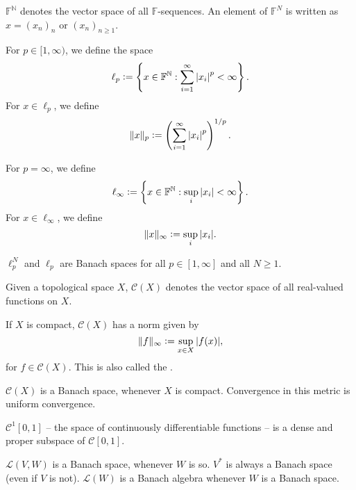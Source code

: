 \documentclass[12pt]{article}	%
\begin{document}
\begin{defn}
	$\mathbb{F}^{\mathbb{N}}$ denotes the vector space of all $\mathbb{F}$-sequences. An element of $\mathbb{F}^{N}$ is written as $x = (x_{n})_{n}$ or $(x_{n})_{n \ge 1}$.

	For $p \in [1, \infty)$, we define the space
	\begin{equation*} 
		\ell_{p} \vcentcolon= \left\{x \in \mathbb{F}^{\mathbb{N}} : \sum_{i = 1}^{\infty} {\left\lvert x_{i} \right\lvert}^{p} < \infty \right\}.
	\end{equation*}
	For $x \in \ell_{p}$, we define
	\begin{equation*} 
		\|x\|_{p} \vcentcolon= \left(\sum_{i = 1}^{\infty} {\left\lvert x_{i} \right\lvert}^{p}\right)^{1/p}.
	\end{equation*}

	For $p = \infty$, we define
	\begin{equation*} 
		\ell_{\infty} \vcentcolon= \left\{x \in \mathbb{F}^{\mathbb{N}} : \sup_{i} {\left\lvert x_{i} \right\lvert} < \infty \right\}.
	\end{equation*}
	For $x \in \ell_{\infty}$, we define
	\begin{equation*} 
		\|x\|_{\infty} \vcentcolon= \sup_{i} {\left\lvert x_{i} \right\lvert}.
	\end{equation*}
\end{defn}

$\ell_{p}^{N}$ and $\ell_{p}$ are Banach spaces for all $p \in [1, \infty]$ and all $N \ge 1$.

\begin{defn}
	Given a topological space $X$, $\mathcal{C}(X)$ denotes the vector space of all real-valued functions on $X$.

	If $X$ is compact, $\mathcal{C}(X)$ has a norm given by
	\begin{equation*} 
		\|f\|_{\infty} \vcentcolon= \sup_{x \in X} {\left\lvert f(x) \right\lvert},
	\end{equation*}
	for $f \in \mathcal{C}(X)$. This is also called the .
\end{defn}

\begin{ex}
	$\mathcal{C}(X)$ is a Banach space, whenever $X$ is compact. Convergence in this metric is uniform convergence.

	$\mathcal{C}^{1}[0, 1]$ -- the space of continuously differentiable functions -- is a dense and proper subspace of $\mathcal{C}[0, 1]$.
\end{ex}

\begin{ex}
	$\mathcal{L}(V, W)$ is a Banach space, whenever $W$ is so. $V^{\ast}$ is always a Banach space (even if $V$ is not). $\mathcal{L}(W)$ is a Banach algebra whenever $W$ is a Banach space.
\end{ex}
\end{document}
